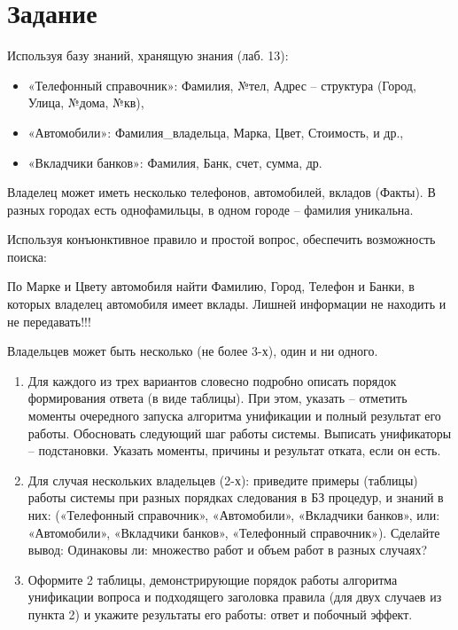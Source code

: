 \documentclass[12pt]{report}
\begin{document}
\section*{Задание}
Используя  базу знаний, хранящую знания (лаб. 13):
\begin{itemize}
	\item «Телефонный справочник»: Фамилия, №тел, Адрес – структура (Город, Улица, №дома, №кв),
	\item «Автомобили»: Фамилия\_владельца, Марка, Цвет, Стоимость, и др.,
	\item «Вкладчики банков»: Фамилия, Банк, счет, сумма, др.
\end{itemize}

Владелец может иметь несколько телефонов, автомобилей, вкладов (Факты). В разных городах есть однофамильцы, в одном городе – фамилия уникальна.

Используя конъюнктивное правило и простой вопрос, обеспечить возможность поиска:

По Марке и Цвету автомобиля найти Фамилию, Город, Телефон и Банки, в которых владелец автомобиля имеет вклады. Лишней информации не находить и не передавать!!!

Владельцев может быть несколько (не более 3-х), один и ни одного.

\begin{enumerate}
	\item Для каждого из трех вариантов словесно подробно описать порядок формирования ответа (в виде таблицы). При этом, указать – отметить моменты очередного запуска алгоритма унификации и полный результат его работы. Обосновать следующий шаг работы системы. Выписать унификаторы – подстановки. Указать моменты, причины и результат отката, если он есть.
	\item Для случая нескольких владельцев (2-х): 
	приведите примеры (таблицы) работы системы при разных порядках следования в БЗ  процедур, и знаний в них: («Телефонный справочник», «Автомобили», «Вкладчики банков», или: «Автомобили», «Вкладчики банков», «Телефонный справочник»). Сделайте вывод: Одинаковы ли: множество работ и объем работ в разных случаях?
	\item Оформите 2 таблицы, демонстрирующие порядок работы алгоритма унификации вопроса и подходящего заголовка правила (для двух случаев из пункта 2) и укажите результаты его работы: ответ и побочный эффект.
\end{enumerate}

\newpage
\end{document}
